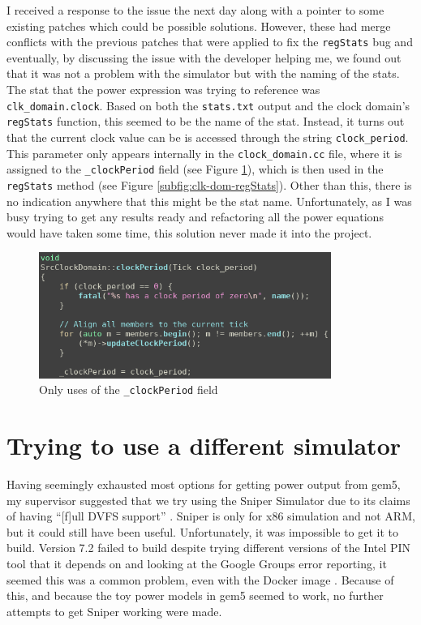 I received a response to the issue the next day along with a pointer to 
some existing patches which could be possible solutions. However, these had 
merge conflicts with the previous patches that were applied to fix the 
\texttt{regStats} bug and eventually, by discussing the issue with the 
developer helping me, we found out that it was not a problem with the 
simulator but with the naming of the stats. The stat that the power 
expression was trying to reference was \texttt{clk\_domain.clock}. Based on 
both the \texttt{stats.txt} output and the clock domain's \texttt{regStats} 
function, this seemed to be the name of the stat. Instead, it turns out 
that the current clock value can be is accessed through the string 
\texttt{clock\_period}. This parameter only appears internally in the 
\texttt{clock\_domain.cc} file, where it is assigned to the 
\texttt{\_clockPeriod} field (see Figure \ref{fig:clock-period-src}), which 
is then used in the \texttt{regStats} method (see Figure 
\ref{subfig:clk-dom-regStats}). Other than this, there is no indication 
anywhere that this might be the stat name. Unfortunately, as I was busy 
trying to get any results ready and refactoring all the power equations 
would have taken some time, this solution never made it into the project.
\begin{figure}[H]
    \centering
    \includegraphics[width=0.85\textwidth]{screenshots/power-model-eldritchness/clock-period-src.png}
    \caption{Only uses of the \texttt{\_clockPeriod} field}
    \label{fig:clock-period-src}
\end{figure}

\section{Trying to use a different simulator}
Having seemingly exhausted most options for getting power output from gem5, my 
supervisor suggested that we try using the Sniper Simulator 
\cite{carlson_sniper_2011,carlson_evaluation_2014} due to its claims of having 
``[f]ull DVFS support'' \cite{noauthor_sniper_2020}. Sniper is only for x86 
simulation and not ARM, but it could still have been useful. Unfortunately, it 
was impossible to get it to build. Version 7.2 failed to build despite trying 
different versions of the Intel PIN tool that it depends on 
\cite{noauthor_getting_2019} and looking at the Google Groups error reporting, 
it seemed this was a common problem, even with the Docker image 
\cite{noauthor_error_2020}. Because of this, and because the toy power models in
gem5 seemed to work, no further attempts to get Sniper working were made.
